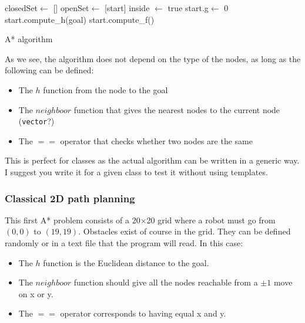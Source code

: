 \documentclass{ecnreport}
\begin{document}
\begin{algorithm}[!t]
{}
closedSet$\gets$ []\;
openSet$\gets$ [start]\;
inside $\gets$ true\; 
start.g$\gets$ 0\;
start.compute\_h(goal)\;
start.compute\_f()\;
\caption{A* algorithm}
\label{algo:smallpoly}
\end{algorithm}

As we see, the algorithm does not depend on the type of the nodes, as long as the following can be defined:
\begin{itemize}
 \item The $h$ function from the node to the goal
 \item The $neighboor$ function that gives the nearest nodes to the current node (\texttt{vector}?)
 \item The $==$ operator that checks whether two nodes are the same
\end{itemize}

This is perfect for classes as the actual algorithm can be written in a generic way. I suggest you write it for a given class to test it without using templates.


\subsubsection{Classical 2D path planning}

This first A* problem consists of a 20$\times$20 grid where a robot must go from $(0,0)$ to $(19,19)$.
Obstacles exist of course in the grid. They can be defined randomly or in a text file that the program will read.
In this case:
\begin{itemize}
 \item The $h$ function is the Euclidean distance to the goal.
 \item The $neighboor$ function should give all the nodes reachable from a $\pm1$ move on x or y.
 \item The $==$ operator corresponds to having equal x and y.
\end{itemize}
\end{document}
